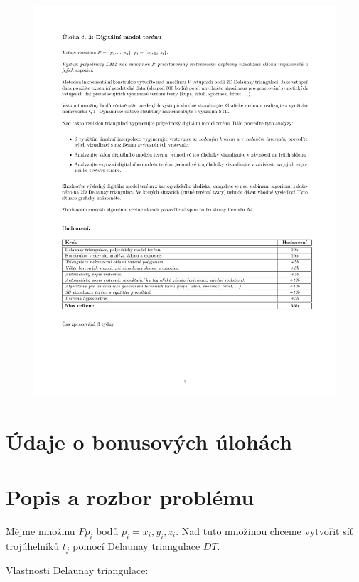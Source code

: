 \documentclass[a4paper, 12pt]{article}
\begin{document}
\begin{figure}[h!]
	\includegraphics[clip, trim=0cm 5cm 0cm 3cm, width=1.0\textwidth]{zadani.pdf}
\end{figure}


\section{Údaje o bonusových úlohách}




\clearpage

\section{Popis a rozbor problému}

Mějme množinu $P {p_i}$ bodů $p_i = {x_i, y_i, z_i}$. Nad tuto množinou chceme vytvořit síť trojúhelníků $t_j$ pomocí Delaunay triangulace $DT$. 

Vlastnosti Delaunay triangulace:
\end{document}

